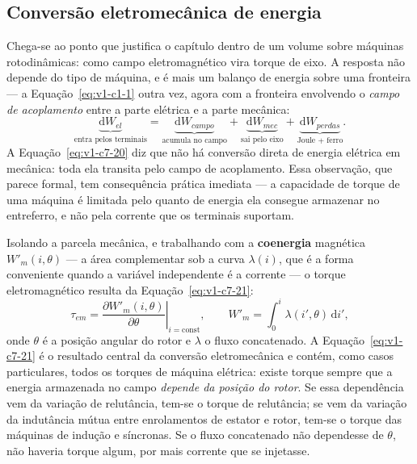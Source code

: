 \documentclass[12pt,a4paper]{article}
\numberwithin{equation}{section}
\numberwithin{table}{section}
\numberwithin{figure}{section}
\begin{document}
\subsection{Conversão eletromecânica de energia}\label{sub:v1-c7-conversao}

Chega-se ao ponto que justifica o capítulo dentro de um volume sobre máquinas
rotodinâmicas: como campo eletromagnético vira torque de eixo. A resposta não
depende do tipo de máquina, e é mais um balanço de energia sobre uma fronteira
--- a Equação~\eqref{eq:v1-c1-1} outra vez, agora com a fronteira envolvendo o
\emph{campo de acoplamento} entre a parte elétrica e a parte mecânica:
\begin{equation}\label{eq:v1-c7-20}
\underbrace{\mathrm{d}W_{el}}_{\text{entra pelos terminais}} =
\underbrace{\mathrm{d}W_{campo}}_{\text{acumula no campo}} +
\underbrace{\mathrm{d}W_{mec}}_{\text{sai pelo eixo}} +
\underbrace{\mathrm{d}W_{perdas}}_{\text{Joule + ferro}} .
\end{equation}
A Equação~\eqref{eq:v1-c7-20} diz que não há conversão direta de energia
elétrica em mecânica: toda ela transita pelo campo de acoplamento. Essa
observação, que parece formal, tem consequência prática imediata --- a
capacidade de torque de uma máquina é limitada pelo quanto de energia ela
consegue armazenar no entreferro, e não pela corrente que os terminais
suportam.

Isolando a parcela mecânica, e trabalhando com a \textbf{coenergia} magnética
$W'_m(i,\theta)$ --- a área complementar sob a curva $\lambda(i)$, que é a forma
conveniente quando a variável independente é a corrente --- o torque
eletromagnético resulta da Equação~\eqref{eq:v1-c7-21}:
\begin{equation}\label{eq:v1-c7-21}
\tau_{em} = \left.\frac{\partial W'_m(i,\theta)}{\partial\theta}\right|_{i=\text{const}},
\qquad
W'_m = \int_0^i \lambda(i',\theta)\,\mathrm{d}i' ,
\end{equation}
onde $\theta$ é a posição angular do rotor e $\lambda$ o fluxo concatenado. A
Equação~\eqref{eq:v1-c7-21} é o resultado central da conversão eletromecânica e
contém, como casos particulares, todos os torques de máquina elétrica: existe
torque sempre que a energia armazenada no campo \emph{depende da posição do
rotor}. Se essa dependência vem da variação de relutância, tem-se o torque de
relutância; se vem da variação da indutância mútua entre enrolamentos de
estator e rotor, tem-se o torque das máquinas de indução e síncronas. Se o
fluxo concatenado não dependesse de $\theta$, não haveria torque algum, por
mais corrente que se injetasse.
\end{document}
